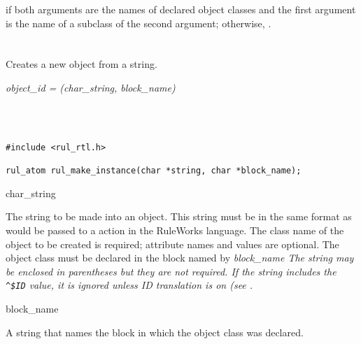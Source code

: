 \ReturnValue

 if both arguments are the names of declared object classes and
the first argument is the name of a subclass of the second argument;
otherwise, .

\begin{seealso}
\end{seealso}

\section*{}

Creates a new object from a string.

\Syntax

\it{object\_id} = (\it{char\_string},
\it{block\_name})

\begin{args}
   \\
   \\
\end{args}

\CBinding
\begin{verbatim}
#include <rul_rtl.h>

rul_atom rul_make_instance(char *string, char *block_name);
\end{verbatim}

\begin{arguments}
\item[char\_string]

  The string to be made into an object. This string must be in the
  same format as would be passed to a  action in the
  RuleWorks language. The class name of the object to be created is
  required; attribute names and values are optional. The object class
  must be declared in the block named by \it{block\_name} The string
  may be enclosed in parentheses but they are not required. If the
  string includes the
  \verb|^$ID| value, it is ignored unless ID translation is on (see
  .

\item[block\_name]

  A string that names the block in which the object class was
  declared.
\end{arguments}

\ReturnValue

